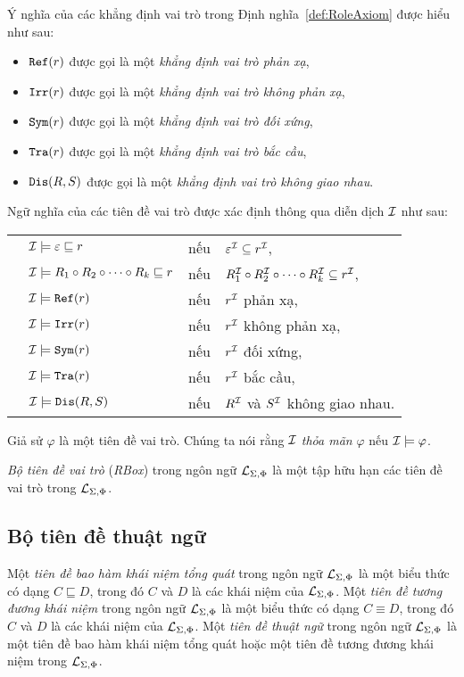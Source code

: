 Ý nghĩa của các khẳng định vai trò trong Định nghĩa~\ref{def:RoleAxiom} được hiểu như sau:
\begin{itemize}
	\item $\mathtt{Ref}(r)$ được gọi là một {\em khẳng định vai trò phản xạ},
	\item $\mathtt{Irr}(r)$ được gọi là một {\em khẳng định vai trò không phản xạ},
	\item $\mathtt{Sym}(r)$ được gọi là một {\em khẳng định vai trò đối xứng},
	\item $\mathtt{Tra}(r)$ được gọi là một {\em khẳng định vai trò bắc cầu},
	\item $\mathtt{Dis}(R,S)$ được gọi là một {\em khẳng định vai trò không giao nhau}.        
\end{itemize}

Ngữ nghĩa của các tiên đề vai trò được xác định thông qua diễn dịch $\mathcal{I}$ như sau:\\[1.0ex]
\begin{tabular}{c l c l}
	& $\mathcal{I} \models \varepsilon \sqsubseteq r$ & nếu & $\varepsilon^{\mathcal{I}} \subseteq r^{\mathcal{I}}$,\\[0.5ex]
	& $\mathcal{I} \models R_1 \circ R_2 \circ \cdots \circ R_k \sqsubseteq r$ & nếu & $R_1^{\mathcal{I}} \circ R_2^{\mathcal{I}} \circ \cdots \circ R_k^{\mathcal{I}} \subseteq r^{\mathcal{I}}$,\\[0.5ex]
	& $\mathcal{I} \models \mathtt{Ref}(r)$ & nếu & $r^{\mathcal{I}}$ phản xạ,\\[0.5ex]
	& $\mathcal{I} \models \mathtt{Irr}(r)$ & nếu & $r^{\mathcal{I}}$ không phản xạ,\\[0.5ex]
	& $\mathcal{I} \models \mathtt{Sym}(r)$ & nếu & $r^{\mathcal{I}}$ đối xứng,\\[0.5ex]
	& $\mathcal{I} \models \mathtt{Tra}(r)$ & nếu & $r^{\mathcal{I}}$ bắc cầu,\\[0.5ex]
	& $\mathcal{I} \models \mathtt{Dis}(R,S)$ & nếu & $R^{\mathcal{I}}$ và $S^{\mathcal{I}}$ không giao nhau.
\end{tabular}

Giả sử $\varphi$ là một tiên đề vai trò. Chúng ta nói rằng $\mathcal{I}$ {\em thỏa mãn} $\varphi$ nếu $\mathcal{I} \models \varphi$.

\begin{Definition}
\label{def:RBox}
	{\em Bộ tiên đề vai trò} ({\em RBox}) trong ngôn ngữ $\mathcal{L}_{\Sigma,\Phi}$ là một tập hữu hạn các tiên đề vai trò trong $\mathcal{L}_{\Sigma,\Phi}$.\myend
\end{Definition}

\subsection{Bộ tiên đề thuật ngữ}
\label{sec:Chap1.TBox}
\begin{Definition}
\label{def:TerminologyAxiom}
	Một {\em tiên đề bao hàm khái niệm tổng quát} trong ngôn ngữ $\mathcal{L}_{\Sigma,\Phi}$ là một biểu thức có dạng $C \sqsubseteq D$, trong đó $C$ và $D$ là các khái niệm của $\mathcal{L}_{\Sigma,\Phi}$. 
%
	Một {\em tiên đề tương đương khái niệm} trong ngôn ngữ $\mathcal{L}_{\Sigma,\Phi}$ là một biểu thức có dạng $C \equiv D$, trong đó $C$ và $D$ là các khái niệm của $\mathcal{L}_{\Sigma,\Phi}$. 
%
	Một {\em tiên đề thuật ngữ} trong ngôn ngữ $\mathcal{L}_{\Sigma,\Phi}$ là một tiên đề bao hàm khái niệm tổng quát hoặc một tiên đề tương đương khái niệm trong $\mathcal{L}_{\Sigma,\Phi}$.\myend
\end{Definition}

